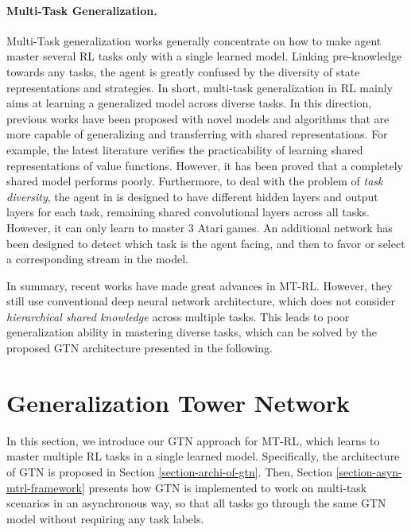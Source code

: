 \documentclass[letterpaper]{article} %
\begin{document}
\paragraph{Multi-Task Generalization.} Multi-Task generalization \cite{borsa2016learning, romoff2016deep, sermanet2016unsupervised} works generally concentrate on how to make agent master several RL tasks only with a single learned model. Linking pre-knowledge towards any tasks, the agent is greatly confused by the diversity of state representations and strategies. In short, multi-task generalization in RL mainly aims at learning a generalized model across diverse tasks. In this direction, previous works have been proposed with novel models and algorithms that are more capable of generalizing and transferring with shared representations. For example, the latest literature \cite{borsa2016learning} verifies the practicability of learning shared representations of value functions. However, it has been proved \cite{romoff2016deep} that a completely shared model performs poorly. Furthermore, to deal with the problem of \textit{task diversity}, the agent in \cite{romoff2016deep} is designed to have different hidden layers and output layers for each task, remaining shared convolutional layers across all tasks. However, it can only learn to master 3 Atari games. An additional network \cite{sermanet2016unsupervised} has been designed to detect which task is the agent facing, and then to favor or select a corresponding stream in the model.

In summary, recent works have made great advances in MT-RL. However, they still use conventional deep neural network architecture, which does not consider \textit{hierarchical shared knowledge} across multiple tasks. This leads to poor generalization ability in mastering diverse tasks, which can be solved by the proposed GTN architecture presented in the following.

\section{Generalization Tower Network}

In this section, we introduce our GTN approach for MT-RL, which learns to master multiple RL tasks in a single learned model.
Specifically, the architecture of GTN is proposed in Section \ref{section-archi-of-gtn}.
Then, Section \ref{section-asyn-mtrl-framework} presents how GTN is implemented to work on multi-task scenarios in an asynchronous way, so that all tasks go through the same GTN model without requiring any task labels.
\end{document}
